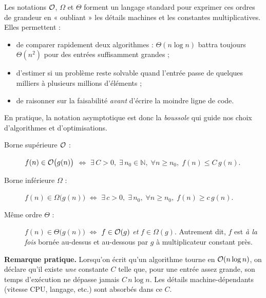 Les notations $\mathcal{O}$, $\Omega$ et $\Theta$ forment un langage standard pour
exprimer ces ordres de grandeur en « oubliant » les détails machines et les
constantes multiplicatives.  Elles permettent :
\begin{itemize}
  \item de comparer rapidement deux algorithmes : $\Theta(n\log n)$ battra
        toujours $\Theta(n^{2})$ pour des entrées suffisamment grandes ;
  \item d’estimer si un problème reste solvable quand l’entrée passe
        de quelques milliers à plusieurs millions d’éléments ;
  \item de raisonner sur la faisabilité \emph{avant} d’écrire la moindre
        ligne de code.
\end{itemize}

En pratique, la notation asymptotique est donc la \emph{boussole} qui guide
nos choix d’algorithmes et d’optimisations.


\begin{description}
  \item[Borne supérieure $\mathcal{O}$ : ]
        \(f(n)\in\mathcal{O}\bigl(g(n)\bigr)\)
        \(\Longleftrightarrow\) \(\exists\,C>0,\;\exists\,n_{0}\in\mathbb N,\;
        \forall n\ge n_{0},\;f(n)\le C\,g(n).\)

  \item[Borne inférieure $\Omega$ : ]
        \(f(n)\in\Omega\bigl(g(n)\bigr)\)
        \(\Longleftrightarrow\) \(\exists\,c>0,\;\exists\,n_{0},\;
        \forall n\ge n_{0},\;f(n)\ge c\,g(n).\)

  \item[Même ordre $\Theta$ : ]
        \(f(n)\in\Theta\bigl(g(n)\bigr)\)
        \(\Longleftrightarrow\) \(f\in\mathcal{O}(g)\) \emph{et}
        \(f\in\Omega(g)\).
        Autrement dit, $f$ est \emph{à la fois} bornée au-dessus et au-dessous
        par $g$ à multiplicateur constant près.

\end{description}

\vspace{0.4em}
\noindent
\textbf{Remarque pratique.}  Lorsqu’on écrit qu’un algorithme tourne en
$\mathcal{O}(n\log n)$, on déclare qu’il existe \emph{une} constante $C$ telle que,
pour une entrée assez grande, son temps d’exécution ne dépasse jamais
$C\,n\log n$.  Les détails machine-dépendants (vitesse CPU, langage, etc.)
sont absorbés dans ce $C$.


